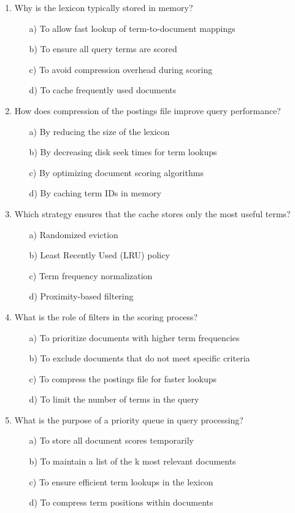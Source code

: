 \documentclass[8pt]{extarticle}
\begin{document}
\begin{multicols}{2}
\begin{enumerate}
\item Why is the lexicon typically stored in memory?
\begin{itemize}
\item[a)] To allow fast lookup of term-to-document mappings
\item[b)] To ensure all query terms are scored
\item[c)] To avoid compression overhead during scoring
\item[d)] To cache frequently used documents
\end{itemize}

\item How does compression of the postings file improve query performance?
\begin{itemize}
\item[a)] By reducing the size of the lexicon
\item[b)] By decreasing disk seek times for term lookups
\item[c)] By optimizing document scoring algorithms
\item[d)] By caching term IDs in memory
\end{itemize}

\item Which strategy ensures that the cache stores only the most useful terms?
\begin{itemize}
\item[a)] Randomized eviction
\item[b)] Least Recently Used (LRU) policy
\item[c)] Term frequency normalization
\item[d)] Proximity-based filtering
\end{itemize}

\item What is the role of filters in the scoring process?
\begin{itemize}
\item[a)] To prioritize documents with higher term frequencies
\item[b)] To exclude documents that do not meet specific criteria
\item[c)] To compress the postings file for faster lookups
\item[d)] To limit the number of terms in the query
\end{itemize}

\item What is the purpose of a priority queue in query processing?
\begin{itemize}
\item[a)] To store all document scores temporarily
\item[b)] To maintain a list of the k most relevant documents
\item[c)] To ensure efficient term lookups in the lexicon
\item[d)] To compress term positions within documents
\end{itemize}


\end{enumerate}
\end{multicols}
\end{document}
